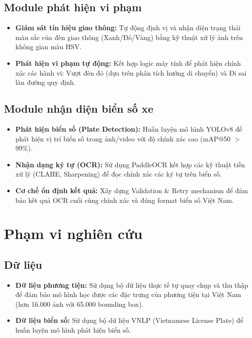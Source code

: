 \subsection{Module phát hiện vi phạm}
\begin{itemize}
    \item \textbf{Giám sát tín hiệu giao thông:} Tự động định vị và nhận diện trạng thái màu sắc của đèn giao thông (Xanh/Đỏ/Vàng) bằng kỹ thuật xử lý ảnh trên không gian màu HSV.
    \item \textbf{Phát hiện vi phạm tự động:} Kết hợp logic máy tính để phát hiện chính xác các hành vi: Vượt đèn đỏ (dựa trên phân tích hướng di chuyển) và Đi sai làn đường quy định.
\end{itemize}

\subsection{Module nhận diện biển số xe}
\begin{itemize}
    \item \textbf{Phát hiện biển số (Plate Detection):} Huấn luyện mô hình YOLOv8 để phát hiện vị trí biển số trong ảnh/video với độ chính xác cao (mAP@50 $>$ 99\%).
    \item \textbf{Nhận dạng ký tự (OCR):} Sử dụng PaddleOCR kết hợp các kỹ thuật tiền xử lý (CLAHE, Sharpening) để đọc chính xác các ký tự trên biển số.
    \item \textbf{Cơ chế ổn định kết quả:} Xây dựng Validation \& Retry mechanism để đảm bảo kết quả OCR cuối cùng chính xác và đúng format biển số Việt Nam.
\end{itemize}

\section{Phạm vi nghiên cứu}

\subsection{Dữ liệu}
\begin{itemize}
    \item \textbf{Dữ liệu phương tiện:} Sử dụng bộ dữ liệu thực tế tự quay chụp và thu thập để đảm bảo mô hình học được các đặc trưng của phương tiện tại Việt Nam (hơn 16.000 ảnh với 65.000 bounding box).
    \item \textbf{Dữ liệu biển số:} Sử dụng bộ dữ liệu VNLP (Vietnamese License Plate) để huấn luyện mô hình phát hiện biển số.
\end{itemize}

